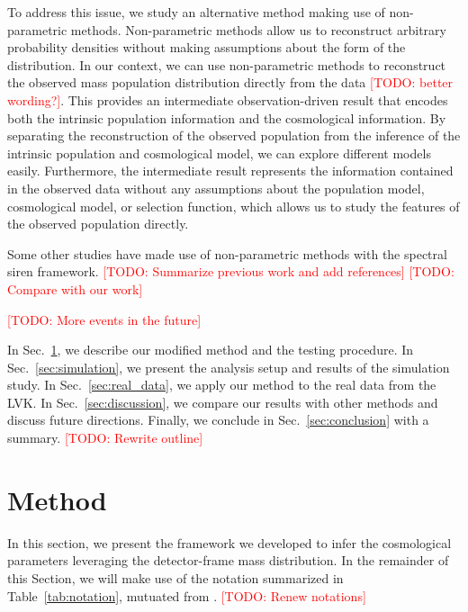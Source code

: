 \documentclass[aps,prd,twocolumn,superscriptaddress,preprintnumbers,nofootinbib,hidelinks]{revtex4-2}
\newcommand{\todo}[1]{\textcolor{red}{[TODO: #1]}}
\begin{document}
To address this issue, we study an alternative method making use of non-parametric methods.
Non-parametric methods allow us to reconstruct arbitrary probability densities without making assumptions about the form of the distribution.
In our context, we can use non-parametric methods to reconstruct the observed mass population distribution directly from the data \todo{better wording?}.
This provides an intermediate observation-driven result that encodes both the intrinsic population information and the cosmological information.
By separating the reconstruction of the observed population from the inference of the intrinsic population and cosmological model, we can explore different models easily.
Furthermore, the intermediate result represents the information contained in the observed data without any assumptions about the population model, cosmological model, or selection function, which allows us to study the features of the observed population directly.

Some other studies have made use of non-parametric methods with the spectral siren framework.
\todo{Summarize previous work and add references}
\todo{Compare with our work}

\todo{More events in the future}

In Sec.~\ref{sec:method}, we describe our modified method and the testing procedure.
In Sec.~\ref{sec:simulation}, we present the analysis setup and results of the simulation study.
In Sec.~\ref{sec:real_data}, we apply our method to the real data from the \ac{LVK}.
In Sec.~\ref{sec:discussion}, we compare our results with other methods and discuss future directions.
Finally, we conclude in Sec.~\ref{sec:conclusion} with a summary.
\todo{Rewrite outline}

\section{Method}
\label{sec:method}
In this section, we present the framework we developed to infer the cosmological parameters leveraging the detector-frame mass distribution. In the remainder of this Section, we will make use of the notation summarized in Table~\ref{tab:notation}, mutuated from \citet{Rinaldi:2021bhm, Rinaldi:2022kyg}.
\todo{Renew notations}
\end{document}
